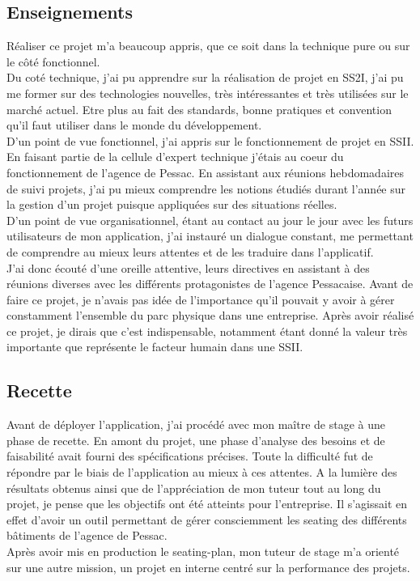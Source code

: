 \documentclass{report}
\newcommand{\jumpOne}{\\[1\baselineskip]}
\newcommand{\jumpTwo}{\\[2\baselineskip]}
\begin{document}
\subsection{Enseignements}
Réaliser ce projet m'a beaucoup appris, que ce soit dans la technique pure ou sur le côté fonctionnel. 
\jumpOne 
Du coté technique, j'ai pu apprendre sur la réalisation de projet en SS2I, j'ai pu me former sur des technologies nouvelles, très intéressantes et très utilisées sur le marché actuel. Etre plus au fait des standards, bonne pratiques et convention qu'il faut utiliser dans le monde du développement. \\ 
D'un point de vue fonctionnel, j'ai appris sur le fonctionnement de projet en SSII. En faisant partie de la cellule d'expert technique j'étais au coeur du fonctionnement de l'agence de Pessac. En assistant aux réunions hebdomadaires de suivi projets, j'ai pu mieux comprendre les notions étudiés durant l'année sur la gestion d'un projet puisque appliquées sur des situations réelles.   \\
D'un point de vue organisationnel, étant au contact au jour le jour avec les futurs utilisateurs de mon application, j'ai instauré un dialogue constant, me permettant de comprendre au mieux leurs attentes et de les traduire dans l'applicatif. \\
J'ai donc écouté d'une oreille attentive, leurs directives en assistant à des réunions diverses avec les différents protagonistes de l'agence Pessacaise. 
Avant de faire ce projet, je n'avais pas idée de l'importance qu'il pouvait y avoir à gérer constamment l'ensemble du parc physique dans une entreprise. Après avoir réalisé ce projet, je dirais que c'est indispensable, notamment étant donné la valeur très importante que représente le facteur humain dans une SSII.

\subsection{Recette}
Avant de déployer l'application, j'ai procédé avec mon maître de stage à une phase de recette. 
En amont du projet, une phase d'analyse des besoins et de faisabilité avait fourni des spécifications précises. Toute la difficulté fut de répondre par le biais de l'application au mieux à ces attentes.  
A la lumière des résultats obtenus ainsi que de l'appréciation de mon tuteur tout au long du projet, je pense que les objectifs ont été atteints pour l'entreprise. Il s'agissait en effet d'avoir un outil permettant de gérer consciemment les seating des différents bâtiments de l'agence de Pessac. 
\jumpTwo
Après avoir mis en production le seating-plan, mon tuteur de stage m'a orienté sur une autre mission, un projet en interne centré sur la performance des projets. 
\end{document}
